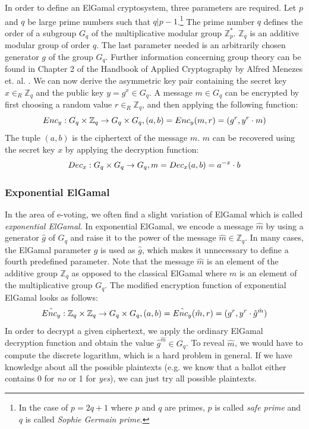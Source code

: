 \documentclass[numbers=noenddot, abstract=on, a4paper, headsepline,
footsepline, oneside, draft=off]{scrreprt}
\begin{document}
In order to define an ElGamal cryptosystem, three parameters are required. Let
$p$ and $q$ be large prime numbers such that $q|p-1$.\footnote{In the case of
$p=2q+1$ where $p$ and $q$ are primes, $p$ is called \emph{safe prime} and $q$
is called \emph{Sophie Germain prime}.}
The prime number $q$ defines the order of a subgroup $G_q$ of the multiplicative
modular group $\mathbb{Z}^*_p$. $\mathbb{Z}_q$ is an additive modular group of order $q$. The
last parameter needed is an arbitrarily chosen generator $g$ of the group $G_q$.
Further information concerning group theory can be found in Chapter 2 of the
Handbook of Applied Cryptography by Alfred Menezes et. al. \cite{book:hac}. We
can now derive the asymmetric key pair containing the secret key $x \in_R
\mathbb{Z}_q$ and the public key $y=g^x \in G_q$. A message $m \in G_q$ can be
encrypted by first choosing a random value $r \in_R \mathbb{Z}_q$, and then
applying the following function:
\begin{equation}
Enc_y : G_q \times \mathbb{Z}_q \rightarrow G_q \times G_q,
(a, b)=Enc_y(m, r)=(g^r, y^r \cdot m) \notag
\end{equation}
The tuple $(a, b)$ is the ciphertext of the message $m$. $m$ can be recovered using the secret key $x$
by applying the decryption function:
\begin{equation}
Dec_x : G_q \times G_q \rightarrow G_q,
m=Dec_x(a, b)=a^{-x} \cdot b \notag
\end{equation}

\subsubsection{Exponential ElGamal}
\label{sec:expelgamal}
In the area of e-voting, we often find a slight variation of ElGamal which is
called \emph{exponential ElGamal}. In exponential ElGamal, we encode a message
$\hat{m}$ by using a generator $\hat{g}$ of $G_q$ and raise it to the power of
the message $\hat{m} \in \mathbb{Z}_q$. In many cases, the ElGamal parameter $g$
is used as $\hat{g}$, which makes it unnecessary to define a fourth predefined
parameter. Note that the message $\hat{m}$ is an element of the additive group
$\mathbb{Z}_q$ as opposed to the classical ElGamal where $m$ is an element of
the multiplicative group $G_q$. The modified encryption function of exponential
ElGamal looks as follows:
\begin{equation}
\hat{Enc_y} : \mathbb{Z}_q \times \mathbb{Z}_q \rightarrow G_q \times G_q,
(a, b)=\hat{Enc_y}(\hat{m}, r)=(g^r, y^r \cdot \hat{g}^{\hat{m}}) \notag
\end{equation}
In order to decrypt a given ciphertext, we apply the ordinary ElGamal decryption
function and obtain the value $\hat{g}^{\hat{m}} \in G_q$. To reveal $\hat{m}$,
we would have to compute the discrete logarithm, which is a hard problem in
general. If we have knowledge about all the possible plaintexts (e.g. we know
that a ballot either contains 0 for \emph{no} or 1 for \emph{yes}), we can just try all
possible plaintexts. 
\end{document}
